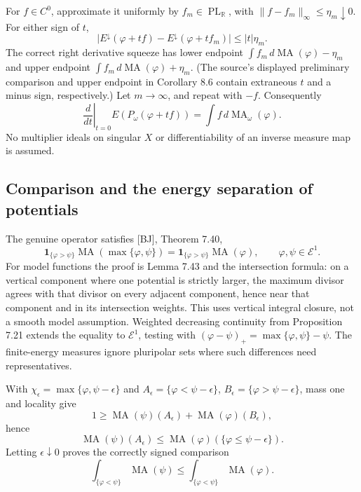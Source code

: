 \documentclass[11pt]{article}
\begin{document}
For \(f\in C^0\), approximate it uniformly by
\(f_m\in\operatorname{PL}_{\mathbb R}\), with
\(\|f-f_m\|_\infty\leq\eta_m\downarrow0\). For either sign of \(t\),
\[|E^\downarrow(\varphi+tf)-E^\downarrow(\varphi+tf_m)|\leq |t|\eta_m.\]
The correct right derivative squeeze has lower endpoint
\(\int f_m\,d\operatorname{MA}(\varphi)-\eta_m\) and upper endpoint
\(\int f_m\,d\operatorname{MA}(\varphi)+\eta_m\). (The source's
displayed preliminary comparison and upper endpoint in Corollary 8.6
contain extraneous \(t\) and a minus sign, respectively.) Let
\(m\to\infty\), and repeat with \(-f\). Consequently
\[\left.\frac{d}{dt}\right|_{t=0}E(P_\omega(\varphi+tf))=\int f\,d\operatorname{MA}_\omega(\varphi).\]
No multiplier ideals on singular \(X\) or differentiability of an
inverse measure map is assumed.

\subsection{Comparison and the energy separation of
potentials}\label{comparison-and-the-energy-separation-of-potentials}

The genuine operator satisfies {[}BJ{]}, Theorem 7.40,
\[\mathbf1_{\{\varphi>\psi\}}\operatorname{MA}(\max\{\varphi,\psi\})
=\mathbf1_{\{\varphi>\psi\}}\operatorname{MA}(\varphi),\qquad\varphi,\psi\in\mathcal E^1.\]
For model functions the proof is Lemma 7.43 and the intersection
formula: on a vertical component where one potential is strictly larger,
the maximum divisor agrees with that divisor on every adjacent
component, hence near that component and in its intersection weights.
This uses vertical integral closure, not a smooth model assumption.
Weighted decreasing continuity from Proposition 7.21 extends the
equality to \(\mathcal E^1\), testing with
\((\varphi-\psi)_+=\max\{\varphi,\psi\}-\psi\). The finite-energy
measures ignore pluripolar sets where such differences need
representatives.

With \(\chi_\epsilon=\max\{\varphi,\psi-\epsilon\}\) and
\(A_\epsilon=\{\varphi<\psi-\epsilon\}\),
\(B_\epsilon=\{\varphi>\psi-\epsilon\}\), mass one and locality give
\[1\geq\operatorname{MA}(\psi)(A_\epsilon)+\operatorname{MA}(\varphi)(B_\epsilon),\]
hence
\[\operatorname{MA}(\psi)(A_\epsilon)\leq\operatorname{MA}(\varphi)(\{\varphi\leq\psi-\epsilon\}).\]
Letting \(\epsilon\downarrow0\) proves the correctly signed comparison
\[\int_{\{\varphi<\psi\}}\operatorname{MA}(\psi)
\leq\int_{\{\varphi<\psi\}}\operatorname{MA}(\varphi).\]
\end{document}
